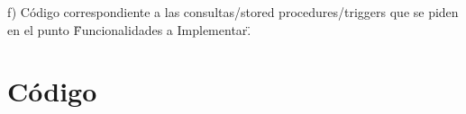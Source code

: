 f) Código correspondiente a las consultas/stored procedures/triggers que se piden en el punto \"Funcionalidades a Implementar\".


\section{Código}
